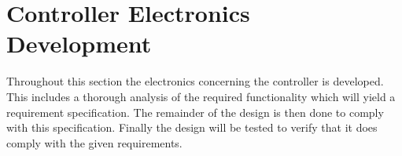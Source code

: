 \section{Controller Electronics Development}
\label{sec:controller_board}
Throughout this section the electronics concerning the controller is developed.
This includes a thorough analysis of the required functionality which will yield a requirement specification.
The remainder of the design is then done to comply with this specification.
Finally the design will be tested to verify that it does comply with the given requirements.



